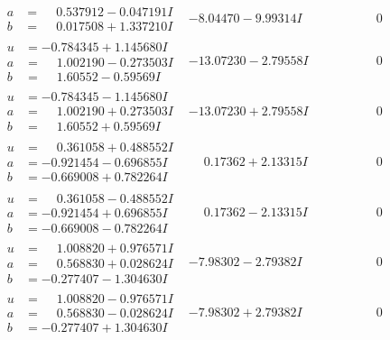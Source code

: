 \documentclass[1p]{elsarticle_modified}
\theoremstyle{definition}
\begin{document}
$$\begin{array}{c|c|c}
\begin{aligned}
a &= \phantom{-}0.537912 - 0.047191 I \\
b &= \phantom{-}0.017508 + 1.337210 I\end{aligned}
 & -8.04470 - 9.99314 I & \phantom{-0.000000 } 0 \\ \hline\begin{aligned}
u &= -0.784345 + 1.145680 I \\
a &= \phantom{-}1.002190 - 0.273503 I \\
b &= \phantom{-}1.60552 - 0.59569 I\end{aligned}
 & -13.07230 - 2.79558 I & \phantom{-0.000000 } 0 \\ \hline\begin{aligned}
u &= -0.784345 - 1.145680 I \\
a &= \phantom{-}1.002190 + 0.273503 I \\
b &= \phantom{-}1.60552 + 0.59569 I\end{aligned}
 & -13.07230 + 2.79558 I & \phantom{-0.000000 } 0 \\ \hline\begin{aligned}
u &= \phantom{-}0.361058 + 0.488552 I \\
a &= -0.921454 - 0.696855 I \\
b &= -0.669008 + 0.782264 I\end{aligned}
 & \phantom{-}0.17362 + 2.13315 I & \phantom{-0.000000 } 0 \\ \hline\begin{aligned}
u &= \phantom{-}0.361058 - 0.488552 I \\
a &= -0.921454 + 0.696855 I \\
b &= -0.669008 - 0.782264 I\end{aligned}
 & \phantom{-}0.17362 - 2.13315 I & \phantom{-0.000000 } 0 \\ \hline\begin{aligned}
u &= \phantom{-}1.008820 + 0.976571 I \\
a &= \phantom{-}0.568830 + 0.028624 I \\
b &= -0.277407 - 1.304630 I\end{aligned}
 & -7.98302 - 2.79382 I & \phantom{-0.000000 } 0 \\ \hline\begin{aligned}
u &= \phantom{-}1.008820 - 0.976571 I \\
a &= \phantom{-}0.568830 - 0.028624 I \\
b &= -0.277407 + 1.304630 I\end{aligned}
 & -7.98302 + 2.79382 I & \phantom{-0.000000 } 0\\

\end{array}$$
\end{document}
